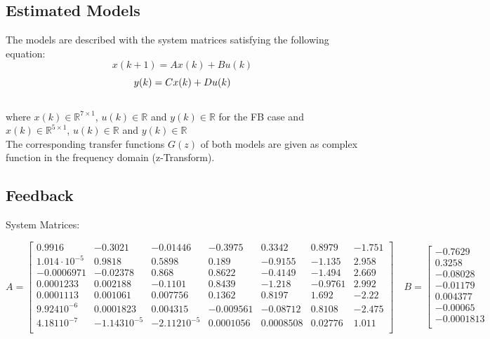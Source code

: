 \begin{landscape}
\chapter{Estimated Models}\label{c:datasheets}

The models are described with the system matrices satisfying the following equation:
\[x(k + 1) = Ax(k) + Bu(k)\]
\[y(k) = Cx(k) + Du(k)\\\]
\\
where $x(k) \in \mathbb{R}^{7\times1}$, $u(k) \in \mathbb{R}$ and $y(k) \in \mathbb{R}$ for the FB case and $x(k) \in \mathbb{R}^{5\times1}$, $u(k) \in \mathbb{R}$ and $y(k) \in \mathbb{R}$\\

The corresponding transfer functions $G(z) $ of both models are given as complex function in the frequency domain (z-Transform).

\section{Feedback}

System Matrices:
 
\[A = \left[ \begin{array}{ccccccc}

        0.9916  &   -0.3021  &  -0.01446  &   -0.3975  &    0.3342  &    0.8979   &   -1.751\\
    1.014\cdot10^{-5} &     0.9818   &   0.5898   &    0.189  &   -0.9155   &   -1.135   &    2.958\\
    -0.0006971 &   -0.02378  &     0.868   &   0.8622  &   -0.4149  &    -1.494   &    2.669\\
    0.0001233  &  0.002188   &  -0.1101  &    0.8439  &    -1.218  &   -0.9761    &   2.992\\
      0.0001113 &   0.001061 &   0.007756   &   0.1362  &    0.8197   &    1.692    &   -2.22\\
      9.92410^{-6} &  0.0001823 &   0.004315  &  -0.009561 &   -0.08712  &    0.8108   &   -2.475\\
     4.18110^{-7} & -1.14310^{-5} & -2.11210^{-5}  &  0.0001056 &  0.0008508  &   0.02776  &     1.011\\

\end{array} \right] \quad B = \left[ \begin{array}{c}

       -0.7629\\
      0.3258\\
       -0.08028\\
       -0.01179\\
      0.004377\\
      -0.00065\\
     -0.0001813\\


\end{array}\]
\end{landscape}
